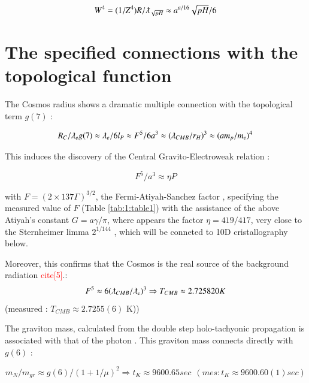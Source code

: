 \documentclass[a4paper,9pt]{article}
\begin{document}
\begin{equation}
W^4 = (1/Z^4)R/\lambdabar_{\sqrt{pH}} \approx a^{a/16} \sqrt{pH}/6  
\end{equation}








\section{The specified connections with the topological function}

The Cosmos radius shows a dramatic multiple connection with the topological term $g(7)$ :

\begin{equation}
R_{C}/\lambdabar_{e} g(7) \approx  \lambdabar_{e}/6l_P \approx F^5/6a^3 \approx (\lambdabar_{CMB}/r_H)^3 \approx  (am_p/m_e)^4  
\end{equation}

This induces the discovery of the Central Gravito-Electroweak relation :

\begin{equation*}
F^5/a^3 \approx \eta P    
\end{equation*}{}
  

with  $F = (2\times 137 \Gamma)^{3/2}$, the Fermi-Atiyah-Sanchez factor \cite{Sanchez}, specifying the measured value of  $F$ (Table \ref{tab:1:table1}) with the assistance of the above Atiyah's constant $G = a \gamma/ \pi$, where appears the factor $\eta = 419/417$, very close to the Sternheimer limma $2^{1/144}$ \cite{Sternheimer}, which will be conneted to 10D cristallography below.


Moreover, this confirms that the Cosmos is the real source of the background radiation \textcolor{red}{cite{[5]}}.:
\begin{equation}
F^5  \approx 6(\lambdabar_{CMB}/\lambdabar_{e})^3 \Rightarrow  T_{CMB}  \approx  2.725820 K  
\end{equation}
(measured : $T_{CMB}  \approx  2.7255(6)$ K))

The graviton mass, calculated from the double step holo-tachyonic propagation is associated with that of the photon \cite{Sanchez}. This graviton mass connects directly with $g(6)$ :

\begin{equation}
m_N/m_{gr} \approx g(6)/(1+1/\mu)^2 \Rightarrow    t_K  \approx  9600.65 sec ~~(mes : t_K \approx 9600.60(1) sec)    
\end{equation}
\end{document}
